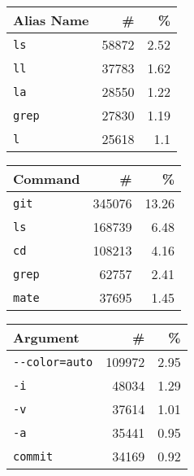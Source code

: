 \begin{table*}[t]
    \caption{Top alias names, commands and arguments}
    \label{tab:top-summary}
    \begin{tabular}{lrr}
        \toprule
               Alias Name &           \# &          \% \\
        \midrule
                \verb|ls| &  \num{58872} &  \num{2.52} \\
                \verb|ll| &  \num{37783} &  \num{1.62} \\
                \verb|la| &  \num{28550} &  \num{1.22} \\
              \verb|grep| &  \num{27830} &  \num{1.19} \\
                 \verb|l| &  \num{25618} &   \num{1.1} \\
        \bottomrule
        \end{tabular}        
    \hspace{0.3cm}
    \begin{tabular}{lrr}
        \toprule
                Command &            \# &           \% \\
        \midrule
             \verb|git| &  \num{345076} &  \num{13.26} \\
              \verb|ls| &  \num{168739} &   \num{6.48} \\
              \verb|cd| &  \num{108213} &   \num{4.16} \\
            \verb|grep| &   \num{62757} &   \num{2.41} \\
            \verb|mate| &   \num{37695} &   \num{1.45} \\
        \bottomrule
        \end{tabular}
    \hspace{0.3cm}
    \begin{tabular}{lrr}
        \toprule
                    Argument &            \# &          \% \\
        \midrule
         \verb|--color=auto| &  \num{109972} &  \num{2.95} \\
                   \verb|-i| &   \num{48034} &  \num{1.29} \\
                   \verb|-v| &   \num{37614} &  \num{1.01} \\
                   \verb|-a| &   \num{35441} &  \num{0.95} \\
               \verb|commit| &   \num{34169} &  \num{0.92} \\
        \bottomrule
        \end{tabular}   
\end{table*}
